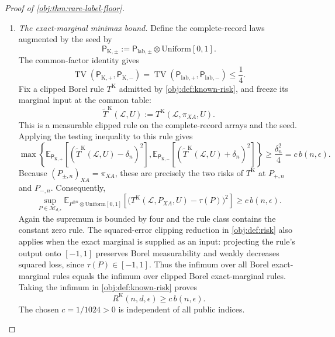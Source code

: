 \begin{proof}[Proof of \cref{obj:thm:rare-label-floor}]
\begin{enumerate}
\item \textit{The exact-marginal minimax bound.}
Define the complete-record laws augmented by the seed by
\[
\mathsf P_{\mathrm K,\pm}
:=
\mathsf P_{\mathrm{lab},\pm}
\otimes\mathrm{Uniform}[0,1].
\]
The common-factor identity gives
\[
\operatorname{TV}
(\mathsf P_{\mathrm K,+},\mathsf P_{\mathrm K,-})
=
\operatorname{TV}
(\mathsf P_{\mathrm{lab},+},\mathsf P_{\mathrm{lab},-})
\le\frac14.
\]
Fix a clipped Borel rule \(T^{\mathrm K}\) admitted by
\cref{obj:def:known-risk}, and freeze its marginal input at the common
table:
\[
\widetilde T^{\mathrm K}(\mathcal L,U)
:=
T^{\mathrm K}(\mathcal L,\pi_{XA},U).
\]
This is a measurable clipped rule on the complete-record arrays and the
seed. Applying the testing inequality to this rule gives
\[
\max\left\{
\mathbb E_{\mathsf P_{\mathrm K,+}}
[(\widetilde T^{\mathrm K}(\mathcal L,U)-\delta_n)^2],
\mathbb E_{\mathsf P_{\mathrm K,-}}
[(\widetilde T^{\mathrm K}(\mathcal L,U)+\delta_n)^2]
\right\}
\ge\frac{\delta_n^2}{4}
=c\,b(n,\epsilon).
\]
Because \((P_{\pm,n})_{XA}=\pi_{XA}\), these are precisely the two risks
of \(T^{\mathrm K}\) at \(P_{+,n}\) and \(P_{-,n}\). Consequently,
\[
\sup_{P\in\mathcal M_{d,\epsilon}}
\mathbb E_{P^{\otimes n}\otimes\mathrm{Uniform}[0,1]}
\left[
\bigl(T^{\mathrm K}(\mathcal L,P_{XA},U)-\tau(P)\bigr)^2
\right]
\ge c\,b(n,\epsilon).
\]
Again the supremum is bounded by four and the rule class contains the
constant zero rule. The squared-error clipping reduction in
\cref{obj:def:risk} also applies when the exact marginal is supplied as
an input: projecting the rule's output onto \([-1,1]\) preserves Borel
measurability and weakly decreases squared loss, since
\(\tau(P)\in[-1,1]\). Thus the infimum over all Borel exact-marginal
rules equals the infimum over clipped Borel exact-marginal rules.
Taking the infimum in \cref{obj:def:known-risk}
proves
\[
R^{\mathrm K}(n,d,\epsilon)\ge c\,b(n,\epsilon).
\]
The chosen \(c=1/1024>0\) is independent of all public indices.


\end{enumerate}
\end{proof}
